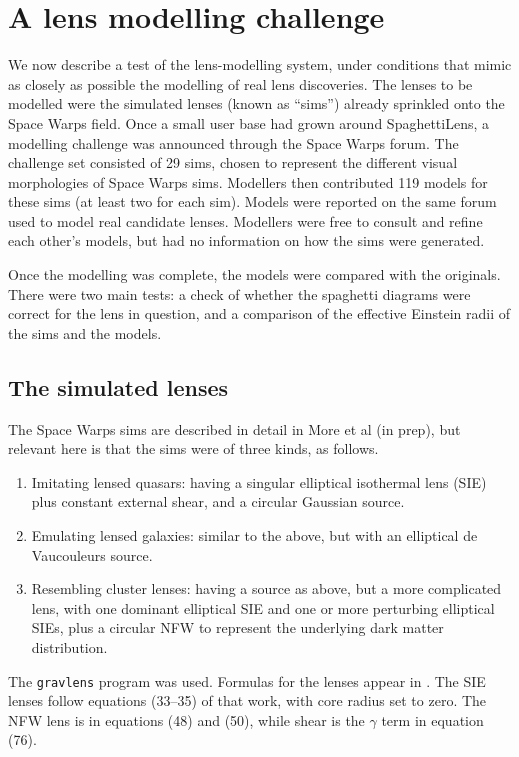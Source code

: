 \documentclass[usenatbib]{mn2e}
\newcommand{\spl}{SpaghettiLens\xspace}
\newcommand{\sw}{Space Warps\xspace}
\begin{document}

\section{A lens modelling challenge} \label{sec:mod_challenge}

We now describe a test of the lens-modelling system, under conditions
that mimic as closely as possible the modelling of real lens
discoveries.  The lenses to be modelled were the simulated lenses
(known as ``sims'') already sprinkled onto the \sw field.  Once a
small user base had grown around \spl, a modelling challenge was
announced through the \sw forum.  The challenge set consisted of 29
sims, chosen to represent the different visual morphologies of \sw
sims. Modellers then contributed 119 models for these sims (at least
two for each sim).  Models were reported on the same forum used to
model real candidate lenses.  Modellers were free to consult and
refine each other's models, but had no information on how the sims
were generated.

Once the modelling was complete, the models were compared with the
originals.  There were two main tests: a check of whether the
spaghetti diagrams were correct for the lens in question, and a
comparison of the effective Einstein radii of the sims and the models.



\subsection{The simulated lenses} \label{sec:sims}

The \sw sims are described in detail in More et al (in prep), but
relevant here is that the sims were of three kinds, as follows.

\begin{enumerate}
  \item Imitating lensed quasars: having a singular elliptical
    isothermal lens (SIE) plus constant external shear, and a circular
    Gaussian source.
  \item Emulating lensed galaxies: similar to the above, but with an
    elliptical de Vaucouleurs source.
  \item Resembling cluster lenses: having a source as above, but a
    more complicated lens, with one dominant elliptical SIE and
    one or more perturbing elliptical SIEs, plus a circular NFW
    \citep{1996ApJ...462..563N,1997ApJ...490..493N} to represent
    the underlying dark matter distribution.
\end{enumerate}
The {\tt gravlens} program \citep{2001astro.ph..2340K} was used.
Formulas for the lenses appear in \cite{2001astro.ph..2341K}. The SIE
lenses follow equations (33--35) of that work, with core radius set to
zero.  The NFW lens is in equations (48) and (50), while shear is the
$\gamma$ term in equation (76).
\end{document}
